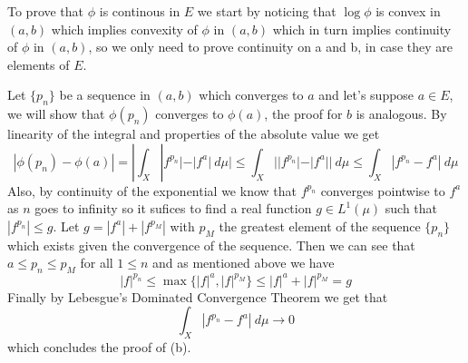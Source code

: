 \documentclass{article}
\begin{document}
\begin{exercise}
    To prove that $\phi$ is continous in $E$ we start by noticing that $\log \phi$ is convex in $ \left( a,b \right) $ which implies convexity of $\phi$ in $ \left( a,b \right) $ which in turn implies continuity of $\phi$ in $ \left( a,b \right) $, so we only need to prove continuity on a and b, in case they are elements of $E$.

    Let $\{p_n\}$ be a sequence in $ \left( a,b \right) $ which converges to $a$ and let's suppose $a \in E$, we will show that $\phi \left( p_n \right) $ converges to $\phi \left( a \right) $, the proof for $b$ is analogous. By linearity of the integral and properties of the absolute value we get
    \[
        |\phi \left( p_n \right) - \phi \left( a \right) | = | \int_X |f^{p_n}| - |f^a|\: d\mu | \le \int_X ||f^{p_n}|-|f^a||\: d\mu \le \int_X |f^{p_n} - f^a|\: d\mu 
    \]
    Also, by continuity of the exponential we know that $f^{p_n}$ converges pointwise to $f^a$ as $n$ goes to infinity so it sufices to find a real function $g \in L^1 \left( \mu \right) $ such that $|f^{p_n}| \le g$. Let $g=|f^a|+|f^{p_M}|$ with $p_M$ the greatest element of the sequence $\{p_n\}$ which exists given the convergence of the sequence. Then we can see that $a \le p_n \le p_M$ for all $1 \le n$ and as mentioned above we have
    \[
        |f|^{p_n} \le \max \{ |f|^a , |f|^{p_M}\} \le |f|^a + |f|^{p_M} = g
    \]
    Finally by Lebesgue's Dominated Convergence Theorem we get that
    \[
        \int_X |f^{p_n} - f^a|\: d\mu \rightarrow 0   
    \]
    which concludes the proof of (b).

\bigbreak


\end{exercise}

\bigbreak
\end{document}
